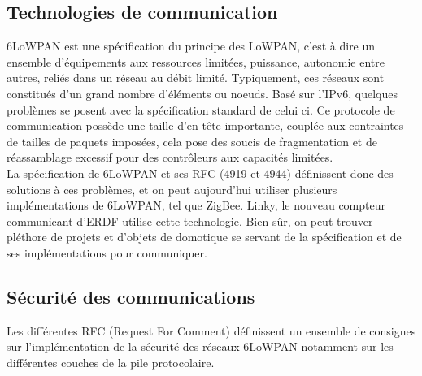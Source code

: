 	\subsection{Technologies de communication}
		6LoWPAN est une spécification du principe des LoWPAN, c'est à dire un ensemble d'équipements aux ressources limitées, puissance, autonomie entre autres, reliés dans un réseau au débit limité. Typiquement, ces réseaux sont constitués d'un grand nombre d'éléments ou noeuds.
		Basé sur l'IPv6, quelques problèmes se posent avec la spécification standard de celui ci.
		Ce protocole de communication possède une taille d'en-tête importante, couplée aux contraintes de tailles de paquets imposées, cela pose des soucis de fragmentation et de réassamblage excessif pour des contrôleurs aux capacités limitées.\\
		La spécification de 6LoWPAN et ses RFC (4919 et 4944) définissent donc des solutions à ces problèmes, et on peut aujourd'hui utiliser plusieurs implémentations de 6LoWPAN, tel que ZigBee. Linky, le nouveau compteur communicant d'ERDF utilise cette technologie. Bien sûr, on peut trouver pléthore de projets et d'objets de domotique se servant de la spécification et de ses implémentations pour communiquer.
		
		
	\subsection{Sécurité des communications}
		Les différentes RFC (Request For Comment) définissent un ensemble de consignes sur l'implémentation de la sécurité des réseaux 6LoWPAN notamment sur les différentes couches de la pile protocolaire.
		
